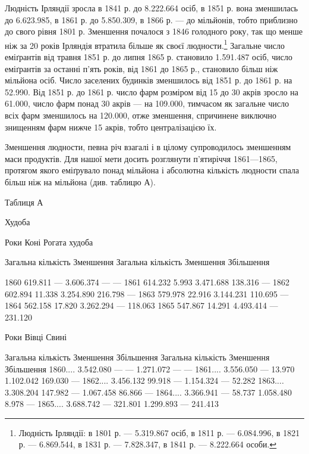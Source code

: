 Людність Ірляндії зросла в 1841 р. до 8.222.664 осіб, в 1851 р.
вона зменшилась до 6.623.985, в 1861 р. до 5.850.309, в 1866 р. —
до  мільйонів, тобто приблизно до свого рівня 1801 р. Зменшення
почалося з 1846 голодного року, так що менше ніж за
20 років Ірляндія втратила більше як  своєї людности.\footnote{
Людність Ірляндії: в 1801 р. — 5.319.867 осіб, в 1811 р. — 6.084.996,
в 1821 р. — 6.869.544, в 1831 р. — 7.828.347, в 1841 р. — 8.222.664 особи.
}
Загальне число еміґрантів від травня 1851 р. до липня 1865 р.
становило 1.591.487 осіб, число еміґрантів за останні п’ять років,
від 1861 до 1865 р., становило більш ніж  мільйона осіб. Число
заселених будинків зменшилось від 1851 р. до 1861 р. на 52.990.
Від 1851 р. до 1861 р. число фарм розміром від 15 до 30 акрів зросло
на 61.000, число фарм понад 30 акрів — на 109.000, тимчасом
як загальне число всіх фарм зменшилось на 120.000, отже зменшення,
спричинене виключно знищенням фарм нижче 15 акрів,
тобто централізацією їх.

Зменшення людности, певна річ взагалі і в цілому супроводилось
зменшенням маси продуктів. Для нашої мети досить
розглянути п’ятиріччя 1861—1865, протягом якого еміґрувало
понад  мільйона і абсолютна кількість людности спала
більш ніж на  мільйона (див. таблицю А).

Таблиця А

Худоба

Роки    Коні    Рогата худоба

    Загальна кількість    Зменшення    Загальна кількість    Зменшення    Збільшення

1860                619.811              —                    3.606.374                       —
                 —
1861                614.232           5.993                 3.471.688                 138.316
          —
1862                602.894          11.338                3.254.890                 216.798
         —
1863                579.978          22.916                3.144.231                 110.695
         —
1864                562.158          17.820                3.262.294                       —
        118.063
1865                547.867          14.291                4.493.414                       —
         231.120

Роки    Вівці            Свині

    Загальна кількість    Зменшення    Збільшення    Загальна кількість    Зменшення    Збільшення
1860....    3.542.080         —                   —              1.271.072          —
      —
1861....    3.556.050         —               13.970         1.102.042       169.030               —
1862....    3.456.132      99.918             —              1.154.324         —
52.282
1863....    3.308.204     147.982            —              1.067.458        86.866                —
1864....    3.366.941        —                58.737         1.058.480       8.978
—
1865....    3.688.742        —                321.801       1.299.893         —
241.413
